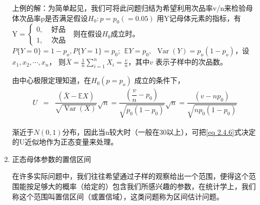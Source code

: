 \begin{enumerate}[1)]
	上例的解：为简单起见，我们可将此问题归结为希望利用次品率v/n来检验母体次品率p是否满足假设$ H_0:p=p_0 (=0.05) $ 用Y记母体元素的指标，有
	 $ \mathrm{Y}=\left\{\begin{array}{ll}
			0, & \text { 好品 } \\
			1, & \text { 次品 }
	\end{array}\right. $ 
	则在假设$ H_0 $成立时。$ P\{Y=0\}=1-p_{o}, P\{Y=1\}=p_{0} ; \ \  \mathbb{E}  Y=p_{0}, \ \ 
	 \operatorname{Var}(Y)=p_{o}\left(1-p_{o}\right) $，设$  x_1, x_2 , \cdots ,x_n $，
	  则$ \bar{X}=\frac{1}{n} \sum_{i=1}^{n} X_{i}=\frac{v}{n} $，其中$ v $ 表示子样中的次品数。
	
	由中心极限定理知道，在$ H_{0}\left(p=p_{o}\right) $ 成立的条件下，
	\begin{eqnarray}
	U  & = & \dfrac{(\bar{X}-\mathbb{E} X)}{\sqrt{\operatorname{Var}(X)}} \sqrt{n}  =  
	  \dfrac{\left(\dfrac{v}{n}-p_{0}\right)}{\sqrt{p_{0}\left(1-p_{0}\right)}} \sqrt{n} =  
	   \dfrac{\left(v-n p_{0}\right)}{\sqrt{n p_{0}\left(1-p_{0}\right)}} 
	\label{eq 2.4.6}
	\end{eqnarray}
	
	渐近于$ N(0,1) $分布，因此当n较大时（一般在30以上），可把\eqref{eq 2.4.6}式决定的U近似地作为正态变量来处理。

		\item 正态母体参数的置信区间
		
		在许多实际问题中，我们往往希望通过子样的观察给出一个范围，便得这个范围能按足够大的概率（给定的）包含我们所感兴趣的参数，在统计学上，我们称这个范围叫置信区间（或置信域），这类问题称为区间估计问题。
		

\end{enumerate}
